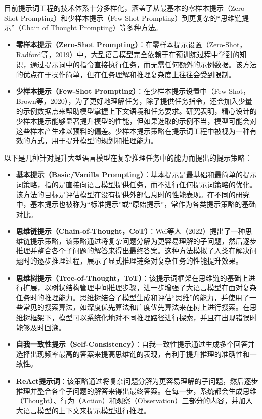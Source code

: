 目前提示词工程的技术体系十分多样化，涵盖了从最基本的零样本提示（Zero-Shot Prompting）和少样本提示（Few-Shot Prompting）到更复杂的“思维链提示”（Chain of Thought Prompting）等多种方法。

\begin{itemize}
    \item \textbf{零样本提示（Zero-Shot Prompting）}：在零样本提示设置（Zero-Shot，Radford等，2019）中，大型语言模型完全依赖于在预训练过程中学到的知识，通过提示词中的指令直接执行任务，而无需任何额外的示例数据。该方法的优点在于操作简单，但在任务理解和推理复杂度上往往会受到限制。
    \item \textbf{少样本提示（Few-Shot Prompting）}：在少样本提示设置中（Few-Shot，Brown等，2020），为了更好地理解任务，除了提供任务指令，还会加入少量的示例数据点来帮助模型掌握上下文语境和任务要求。研究表明，精心设计的少样本提示能够显著提升模型的性能，但如果选取的示例不当，模型可能会对这些样本产生难以预料的偏差。少样本提示策略在提示词工程中被视为一种有效的方式，用于提升模型的规划和推理能力。
\end{itemize}

以下是几种针对提升大型语言模型在复杂推理任务中的能力而提出的提示策略：

\begin{itemize}
    \item \textbf{基本提示（Basic/Vanilla Prompting）}：基本提示是最基础和最简单的提示词策略，指的是直接向语言模型提供任务，而不进行任何提示词策略的优化。该方法的目标是评估模型在没有提供外部信息时的性能表现。在不同的研究中，基本提示也被称为“标准提示”或“原始提示”，常作为各类提示策略的基础对比。
    \item \textbf{思维链提示（Chain-of-Thought，CoT）}：Wei等人（2022）提出了一种思维链提示策略，该策略通过将复杂问题分解为更容易理解的子问题，然后逐步推理并整合各个子问题的解答来得出最终答案。这种方法模拟了人类在解决问题时的逐步推理过程，展示了显式推理链条对复杂任务的性能提升效果。
    \item \textbf{思维树提示（Tree-of-Thought，ToT）}：该提示词框架在思维链的基础上进行扩展，以树状结构管理中间推理步骤，进一步增强了大语言模型在面对复杂任务时的推理能力。思维树结合了模型生成和评估“思维”的能力，并使用了一些常见的搜索算法，如深度优先算法和广度优先算法来在树上进行搜索。在思维树框架下，模型可以系统化地对不同推理路径进行探索，并且在出现错误时能够及时回溯。
    \item \textbf{自我一致性提示（Self-Consistency）}：自我一致性提示通过生成多个回答并选择出现频率最高的答案来提高思维链的表现，有利于提升推理的准确性和一致性。
    \item \textbf{ReAct提示词}：该策略通过将复杂问题分解为更容易理解的子问题，然后逐步推理并整合各个子问题的解答来得出最终答案。在每一步，系统都会生成思维（Thought）、行为（Action）和观察（Observation）三部分的内容，并加入大语言模型的上下文来提示模型进行推理。
\end{itemize}

